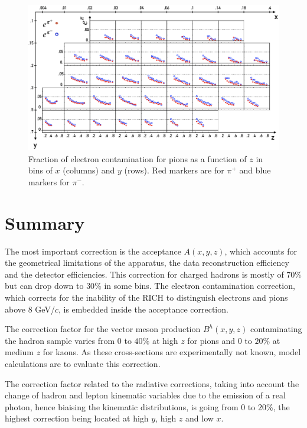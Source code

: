 \begin{figure}
	\includegraphics[scale=0.7]{./gfx/econt.png}
	\caption{Fraction of electron contamination for pions as a function of $z$ in bins of $x$ (columns) and $y$ (rows). Red markers are for $\pi^+$ and blue markers for $\pi^-$.}
	\label{pic:epi}
\end{figure}

\newpage

\section{Summary}

The most important correction is the acceptance $A(x,y,z)$, which accounts for the geometrical limitations of the apparatus, the data reconstruction efficiency and the detector efficiencies. This correction for charged hadrons is mostly of $70$\% but can drop down to $30$\% in some bins. The electron contamination correction, which corrects for the inability of the RICH to distinguish electrons and pions above $8$ GeV/$c$, is embedded inside the acceptance correction.

The correction factor for the vector meson production $B^h(x,y,z)$ contaminating the hadron sample varies from $0$ to $40$\% at high $z$ for pions and $0$ to $20$\% at medium $z$ for kaons. As these cross-sections are experimentally not known, model calculations are to evaluate this correction.

The correction factor related to the radiative corrections, taking into account the change of hadron and lepton kinematic variables due to the emission of a real photon, hence biaising the kinematic distributions, is going from $0$ to $20$\%, the highest correction being located at high $y$, high $z$ and low $x$.
